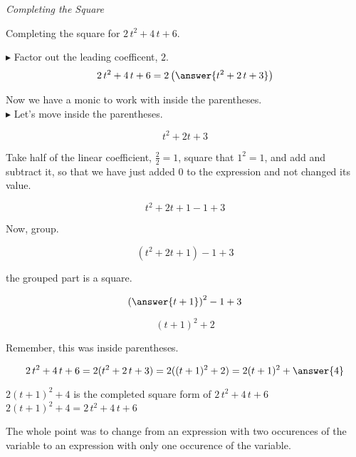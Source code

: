 \documentclass{ximera}
\begin{document}
\begin{example} \textit{Completing the Square}



Completing the square for $2 \, t^2 + 4 \, t + 6$.


\begin{explanation}

$\blacktriangleright$ Factor out the leading coefficent, $2$.\\

\[     2 \, t^2 + 4 \, t + 6 = 2 \left( \answer{t^2 + 2 \, t + 3} \right)   \] 


Now we have a monic to work with inside the parentheses. \\


$\blacktriangleright$ Let's move inside the parentheses.

\[ t^2 + 2 t + 3 \]

Take half of the linear coefficient, $\frac{2}{2} = 1$, square that $1^2 = 1$, and add and subtract it, so that we have just added $0$ to the expression and not changed its value.


\[ t^2 + 2 t + 1 - 1 +3 \]


Now, group.

\[ (t^2 + 2 t + 1)- 1 +3 \]

the grouped part is a square.

\[ \left( \answer{t+1} \right)^2- 1 +3 \]

\[ (t+1)^2 + 2 \]

Remember, this was inside parentheses.

\[     2 \, t^2 + 4 \, t + 6 = 2 (t^2 + 2 \, t + 3)  = 2 ((t+1)^2 + 2) =  2 (t+1)^2 + \answer{4}\] 


$2 (t+1)^2 + 4$ is the completed square form of $2 \, t^2 + 4 \, t + 6$ \\


$2 (t+1)^2 + 4 = 2 \, t^2 + 4 \, t + 6$

\end{explanation}



\end{example}














The whole point was to change from an expression with two occurences of the variable to an expression with only one occurence of the variable.
\end{document}
